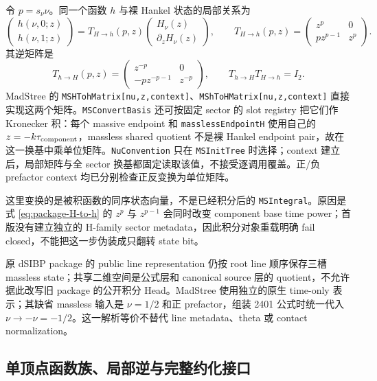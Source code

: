 \documentclass[11pt,a4paper]{ctexart}
\begin{document}
令 $p=s_\nu\nu$。同一个函数 $h$ 与裸 Hankel 状态的局部关系为
\begin{equation}
 \begin{pmatrix}h(\nu,0;z)\\h(\nu,1;z)\end{pmatrix}
 =T_{H\to h}(p,z)
 \begin{pmatrix}H_\nu(z)\\\partial_zH_\nu(z)\end{pmatrix},
 \qquad
 T_{H\to h}(p,z)=
 \begin{pmatrix}
  z^p&0\\p z^{p-1}&z^p
 \end{pmatrix}.
 \label{eq:package-H-to-h}
\end{equation}
其逆矩阵是
\begin{equation}
 T_{h\to H}(p,z)=
 \begin{pmatrix}
  z^{-p}&0\\-p z^{-p-1}&z^{-p}
 \end{pmatrix},
 \qquad
 T_{h\to H}T_{H\to h}=I_2.
 \label{eq:package-h-to-H}
\end{equation}
MadStree 的 \texttt{MSHTohMatrix[nu,z,context]}、\texttt{MShToHMatrix[nu,z,context]} 直接实现这两个矩阵。\texttt{MSConvertBasis} 还可按固定 sector 的 slot registry 把它们作 Kronecker 积：每个 massive endpoint 和 \texttt{masslessEndpointH} 使用自己的 $z=-k\tau_{\rm component}$，massless shared quotient 不是裸 Hankel endpoint pair，故在这一换基中乘单位矩阵。\texttt{NuConvention} 只在 \texttt{MSInitTree} 时选择；context 建立后，局部矩阵与全 sector 换基都固定读取该值，不接受逐调用覆盖。正/负 prefactor context 均已分别检查正反变换为单位矩阵。

这里变换的是被积函数的同序状态向量，不是已经积分后的 \texttt{MSIntegral}。原因是式 \eqref{eq:package-H-to-h} 的 $z^p$ 与 $z^{p-1}$ 会同时改变 component base time power；首版没有建立独立的 H-family sector metadata，因此积分对象重载明确 fail closed，不能把这一步伪装成只翻转 state bit。

原 dSIBP package 的 public line representation 仍按 root line 顺序保存三槽 massless state；共享二维空间是公式层和 canonical source 层的 quotient，不允许据此改写旧 package 的公开积分 Head。MadStree 使用独立的原生 time-only 表示；其缺省 massless 输入是 $\nu=1/2$ 和正 prefactor，组装 2401 公式时统一代入 $\nu\to-\nu=-1/2$。这一解析等价不替代 line metadata、theta 或 contact normalization。

\subsection{单顶点函数族、局部逆与完整约化接口}
\end{document}
